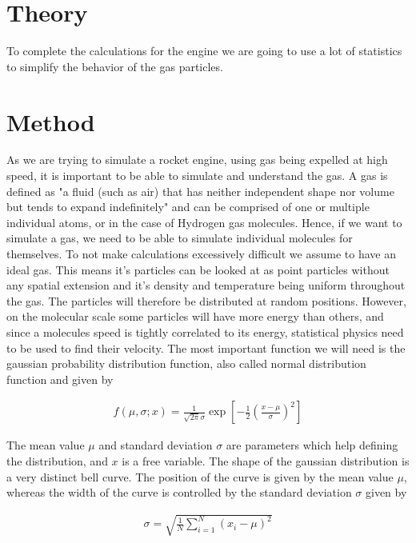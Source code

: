 \documentclass[reprint,english,notitlepage]{revtex4-2}
\begin{document}
\section{Theory}
To complete the calculations for the engine we are going to use a lot of statistics to simplify the behavior of the gas particles. 

\section{Method}
As we are trying to simulate a rocket engine, using gas being expelled at high speed, it is important to be able to simulate and understand the gas.
A gas is defined as "a fluid (such as air) that has neither independent shape nor volume but tends to expand indefinitely"
and can be comprised of one or multiple individual atoms, or in the case of Hydrogen gas molecules.
Hence, if we want to simulate a gas, we need to be able to simulate individual molecules for themselves.
To not make calculations excessively difficult we assume to have an ideal gas.
This means it's particles can be looked at as point particles without any spatial extension and it's density and temperature being uniform throughout the gas.
The particles will therefore be distributed at random positions.
However, on the molecular scale some particles will have more energy than others, and since a molecules speed is tightly correlated to its energy, statistical physics need to be used to find their velocity.
The most important function we will need is the gaussian probability distribution function, also called normal distribution function and given by

\begin{align}
    f(\mu, \sigma; x) = \frac{1}{\sqrt{2\pi}\sigma} \exp \left[-\frac{1}{2}\left(\frac{x-\mu}{\sigma}\right)^2 \right] \label{Normal_Distribution}
\end{align}

The mean value $\mu$ and standard deviation $\sigma$ are parameters which help defining the distribution, and $x$ is a free variable.
The shape of the gaussian distribution is a very distinct bell curve. The position of the curve is given by the mean value $\mu$, whereas the width of the curve is controlled by the standard deviation $\sigma$ given by

\begin{align*}
    \sigma = \sqrt{\frac{1}{N}\sum_{i = 1}^{N} \left(x_i-\mu \right)^2}
\end{align*}
\end{document}
